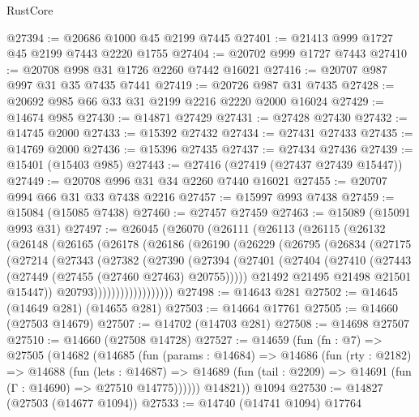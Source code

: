 \begin{lexlean}{RustCore}
\begin{coremodule}
@27394 := @20686 @1000 @45 @2199 @7445
@27401 := @21413 @999 @1727 @45 @2199 @7443 @2220 @1755
@27404 := @20702 @999 @1727 @7443
@27410 := @20708 @998 @31 @1726 @2260 @7442 @16021
@27416 := @20707 @987 @997 @31 @35 @7435 @7441
@27419 := @20726 @987 @31 @7435
@27428 := @20692 @985 @66 @33 @31 @2199 @2216 @2220 @2000 @16024
@27429 := @14674 @985
@27430 := @14871 @27429
@27431 := @27428 @27430
@27432 := @14745 @2000
@27433 := @15392 @27432
@27434 := @27431 @27433
@27435 := @14769 @2000
@27436 := @15396 @27435
@27437 := @27434 @27436
@27439 := @15401 (@15403 @985)
@27443 := @27416 (@27419 (@27437 @27439 @15447))
@27449 := @20708 @996 @31 @34 @2260 @7440 @16021
@27455 := @20707 @994 @66 @31 @33 @7438 @2216
@27457 := @15997 @993 @7438
@27459 := @15084 (@15085 @7438)
@27460 := @27457 @27459
@27463 := @15089 (@15091 @993 @31)
@27497 := @26045
    (@26070
      (@26111
        (@26113
          (@26115
            (@26132
              (@26148
                (@26165
                  (@26178
                    (@26186
                      (@26190
                        (@26229
                          (@26795
                            (@26834
                              (@27175
                                (@27214
                                  (@27343
                                    (@27382
                                      (@27390
                                        (@27394
                                          (@27401
                                            (@27404
                                              (@27410
                                                (@27443 (@27449 (@27455 (@27460 @27463) @20755)))))
                                            @21492
                                            @21495
                                            @21498
                                            @21501
                                            @15447))
                                        @20793))))))))))))))))))
@27498 := @14643 @281
@27502 := @14645 (@14649 @281) (@14655 @281)
@27503 := @14664 @17761
@27505 := @14660 (@27503 @14679)
@27507 := @14702 (@14703 @281)
@27508 := @14698 @27507
@27510 := @14660 (@27508 @14728)
@27527 := @14659
    (fun (fn : @7) =>
    @27505
      (@14682
        (@14685
          (fun (params : @14684) =>
          @14686
            (fun (rty : @2182) =>
            @14688
              (fun (lets : @14687) =>
              @14689 (fun (tail : @2209) => @14691 (fun (Γ : @14690) => @27510 @14775))))))
        @14821))
    @1094
@27530 := @14827 (@27503 (@14677 @1094))
@27533 := @14740 (@14741 @1094) @17764

\end{coremodule}
\end{lexlean}
